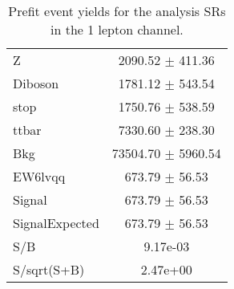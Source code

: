\begin{table}
\begin{tabular}{|l|c|}
Z & 2090.52 $\pm$ 411.36\\
Diboson & 1781.12 $\pm$ 543.54\\
stop & 1750.76 $\pm$ 538.59\\
ttbar & 7330.60 $\pm$ 238.30\\
\hline
Bkg & 73504.70 $\pm$ 5960.54\\
\hline
EW6lvqq & 673.79 $\pm$ 56.53\\
\hline
Signal & 673.79 $\pm$ 56.53\\
SignalExpected & 673.79 $\pm$ 56.53\\
\hline
S/B & 9.17e-03\\
S/sqrt(S+B) & 2.47e+00\\
\hline
\end{tabular}
\caption{Prefit event yields for the analysis SRs in the 1 lepton channel.}
\label{tab:1lepPrefitYield_SR}
\end{table}


